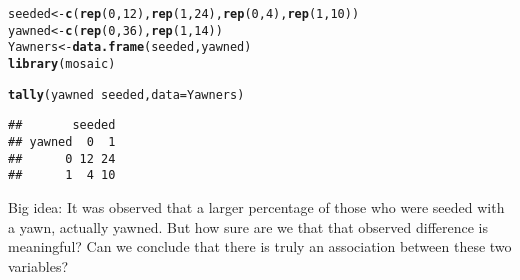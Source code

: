 \documentclass[10pt]{article}\usepackage[]{graphicx}\usepackage[]{color}
\makeatletter
\newcommand{\hlnum}[1]{\textcolor[rgb]{0.686,0.059,0.569}{#1}}%
\newcommand{\hlopt}[1]{\textcolor[rgb]{0,0,0}{#1}}%
\newcommand{\hlstd}[1]{\textcolor[rgb]{0.345,0.345,0.345}{#1}}%
\newcommand{\hlkwb}[1]{\textcolor[rgb]{0.69,0.353,0.396}{#1}}%
\newcommand{\hlkwc}[1]{\textcolor[rgb]{0.333,0.667,0.333}{#1}}%
\newcommand{\hlkwd}[1]{\textcolor[rgb]{0.737,0.353,0.396}{\textbf{#1}}}%
\newenvironment{kframe}{%
 \def\at@end@of@kframe{}%
 \ifinner\ifhmode%
  \def\at@end@of@kframe{\end{minipage}}%
  \begin{minipage}{\columnwidth}%
 \fi\fi%
 \def\FrameCommand##1{\hskip\@totalleftmargin \hskip-\fboxsep
 \colorbox{shadecolor}{##1}\hskip-\fboxsep
     \hskip-\linewidth \hskip-\@totalleftmargin \hskip\columnwidth}%
 \MakeFramed {\advance\hsize-\width
   \@totalleftmargin\z@ \linewidth\hsize
   \@setminipage}}%
 {\par\unskip\endMakeFramed%
 \at@end@of@kframe}
\newenvironment{knitrout}{}{} %
\makeatother
\begin{document}
\begin{knitrout}
\color{fgcolor}\begin{kframe}
\begin{alltt}
\hlstd{seeded} \hlkwb{<-} \hlkwd{c}\hlstd{(}\hlkwd{rep}\hlstd{(}\hlnum{0}\hlstd{,} \hlnum{12}\hlstd{),} \hlkwd{rep}\hlstd{(}\hlnum{1}\hlstd{,} \hlnum{24}\hlstd{),} \hlkwd{rep}\hlstd{(}\hlnum{0}\hlstd{,} \hlnum{4}\hlstd{),} \hlkwd{rep}\hlstd{(}\hlnum{1}\hlstd{,} \hlnum{10}\hlstd{))}
\hlstd{yawned} \hlkwb{<-} \hlkwd{c}\hlstd{(}\hlkwd{rep}\hlstd{(}\hlnum{0}\hlstd{,} \hlnum{36}\hlstd{),} \hlkwd{rep}\hlstd{(}\hlnum{1}\hlstd{,} \hlnum{14}\hlstd{))}
\hlstd{Yawners} \hlkwb{<-} \hlkwd{data.frame}\hlstd{(seeded, yawned)}
\hlkwd{library}\hlstd{(mosaic)}
\end{alltt}


{\ttfamily\noindent\color{warningcolor}{\#\# Warning: package 'mosaic' was built under R version 3.2.5}}

{\ttfamily\noindent\color{warningcolor}{\#\# Warning: package 'dplyr' was built under R version 3.2.5}}

{\ttfamily\noindent\color{warningcolor}{\#\# Warning: package 'ggplot2' was built under R version 3.2.5}}

{\ttfamily\noindent\color{warningcolor}{\#\# Warning: package 'mosaicData' was built under R version 3.2.5}}\begin{alltt}
\hlkwd{tally}\hlstd{(yawned} \hlopt{~} \hlstd{seeded,} \hlkwc{data} \hlstd{= Yawners)}
\end{alltt}
\begin{verbatim}
##       seeded
## yawned  0  1
##      0 12 24
##      1  4 10
\end{verbatim}
\end{kframe}
\end{knitrout}


Big idea: It was observed that a larger percentage of those who were seeded with a yawn, actually yawned. But how sure are we that that observed difference is meaningful? Can we conclude that there is truly an association between these two variables?  
\end{document}
